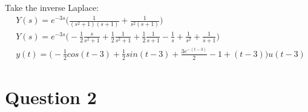 \documentclass[12pt]{article}
\begin{document}
Take the inverse Laplace:
\begin{align*}
  &Y(s) = e^{-3s}\bigg(\frac{1}{(s^2 + 1)(s + 1)} + \frac{1}{s^2(s + 1)}\bigg)
  \\ &Y(s) = e^{-3s}\bigg(-\frac{1}{2}\frac{s}{s^2 + 1} + \frac{1}{2}\frac{1}{s^2 + 1} + \frac{1}{2}\frac{1}{s + 1} -\frac{1}{s} + \frac{1}{s^2} + \frac{1}{s + 1}\bigg)
    \\ &y(t) = \bigg(-\frac{1}{2}cos(t - 3) + \frac{1}{2}sin(t - 3) + \frac{3e^{-(t-3)}}{2} - 1 + (t - 3)\bigg)u(t - 3) \tag{2 marks}
\end{align*}

\section*{Question 2}
\end{document}
